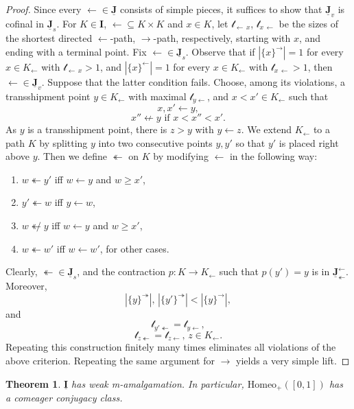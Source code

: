 \documentclass[12pt]{amsart}
\numberwithin{equation}{section}
\theoremstyle{plain}
\newtheorem{theorem}{Theorem}[section]
\theoremstyle{definition}
\newcommand \Homeo{ \mbox{Homeo}}
\newcommand \la{\leftarrow}
\newcommand \ra{\rightarrow}
\newcommand \tla{\twoheadleftarrow}
\newcommand \IIb{\mathbf{I}}
\newcommand \IIub{\underline{\mathbf{I}}}
\newcommand \JJub{\underline{\mathbf{J}}}
\newcommand \ttt{\mathcal{t}}
\begin{document}
\begin{proof}
Since every $\la \in \JJub$ consists of simple pieces, it suffices to show that $\JJub_v$ is cofinal in $\JJub_s$. For $K \in \IIb$, $\leftarrow \subseteq K \times K$ and $x \in K$, let $\ttt_{\la \, x}$, $\ttt_{x \, \la}$ be the sizes of the shortest directed $\la$-path, $\ra$-path, respectively, starting with $x$, and ending with a terminal point. Fix $\leftarrow \in \JJub_s$. Observe that if $|\{x\}^\ra|=1$ for every $x \in K_\leftarrow$ with $\ttt_{\leftarrow \, x}>1$, and $|\{x\}^\la|=1$ for every $x \in K_\leftarrow$ with $\ttt_{x \,\la }>1$, then $\la \in \JJub_v$. Suppose that the latter condition fails. Choose, among its violations, a transshipment point $y \in K_\leftarrow$ with maximal $\ttt_{y \la}$, and $x<x' \in K_\leftarrow$ such that $$x,x' \leftarrow y,$$ $$x'' \not \leftarrow y \mbox{ if } x<x''<x'.$$ As $y$ is a transshipment point, there is $z>y$ with $y \leftarrow z$. We extend $K_\leftarrow$ to a path $K$ by splitting $y$ into two consecutive points $y, y'$ so that $y'$ is placed right above $y$. %
Then we define $\twoheadleftarrow$ on $K$ by modifying $\leftarrow$ in the following way:
	
	\begin{enumerate}
		\item $w \twoheadleftarrow y'$ iff $w \leftarrow y$  and $w \geq x'$,
		\item $y' \twoheadleftarrow w$ iff $y \leftarrow w$,
		\item $w \not\tla y$ iff $w \la y$ and $w \geq x'$,
		\item $w \twoheadleftarrow w'$ iff $w \leftarrow w'$, for other cases. 
	\end{enumerate}
	
	Clearly, ${\tla} \in \JJub_s$, and the contraction $p:K \rightarrow K_\la$ such that $p(y')=y$ is in $\JJub^\la_\tla$. Moreover, $$|\{y\}^\twoheadrightarrow|, \, |\{y'\}^\twoheadrightarrow|< |\{y\}^\ra|,$$ and 
	$$\ttt_{y' \tla } =\ttt_{y \la},$$
	$$ \ttt_{z \tla}=\ttt_{z \la}, \, z \in K_\la.$$ 
%
Repeating this construction finitely many times eliminates all violations of the above criterion. Repeating the same argument for $\ra$ yields a very simple lift.
\end{proof}


\begin{theorem}
	\label{th:IhasCAP}
	$\IIub$ has weak m-amalgamation. In particular,  $\Homeo_+([0,1])$ has a comeager conjugacy class.
\end{theorem}
\end{document}
